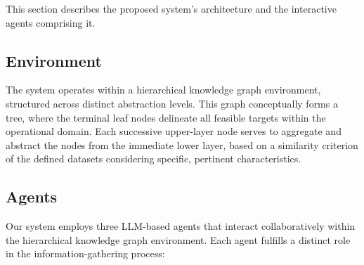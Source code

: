 \documentclass[letterpaper]{article} %
\begin{document}
This section describes the proposed system's architecture and the interactive agents comprising it.

\subsection{Environment}
The system operates within a hierarchical knowledge graph environment, structured across distinct abstraction levels. This graph conceptually forms a tree, where the terminal leaf nodes delineate all feasible targets within the operational domain. Each successive upper-layer node serves to aggregate and abstract the nodes from the immediate lower layer, based on a similarity criterion of the defined datasets considering specific, pertinent characteristics.


\subsection{Agents}

Our system employs three LLM-based agents that interact collaboratively within the hierarchical knowledge graph environment. Each agent fulfills a distinct role in the information-gathering process:
\end{document}
